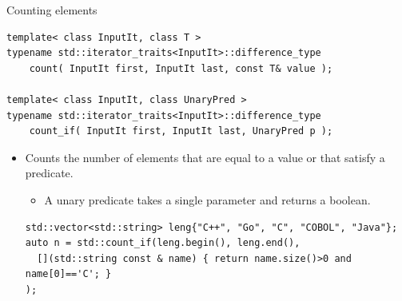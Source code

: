 \begin{frame}[t,fragile]{Counting elements}
\begin{lstlisting}
template< class InputIt, class T >
typename std::iterator_traits<InputIt>::difference_type
    count( InputIt first, InputIt last, const T& value );

template< class InputIt, class UnaryPred >
typename std::iterator_traits<InputIt>::difference_type
    count_if( InputIt first, InputIt last, UnaryPred p );
\end{lstlisting}
\begin{itemize}
  \item Counts the number of elements that are equal to a value 
        or that satisfy a predicate.
    \begin{itemize}
      \item A unary predicate takes a single parameter and returns a boolean.
    \end{itemize}

\begin{lstlisting}
std::vector<std::string> leng{"C++", "Go", "C", "COBOL", "Java"};
auto n = std::count_if(leng.begin(), leng.end(), 
  [](std::string const & name) { return name.size()>0 and name[0]=='C'; }
);
\end{lstlisting}
\end{itemize}
\end{frame}
